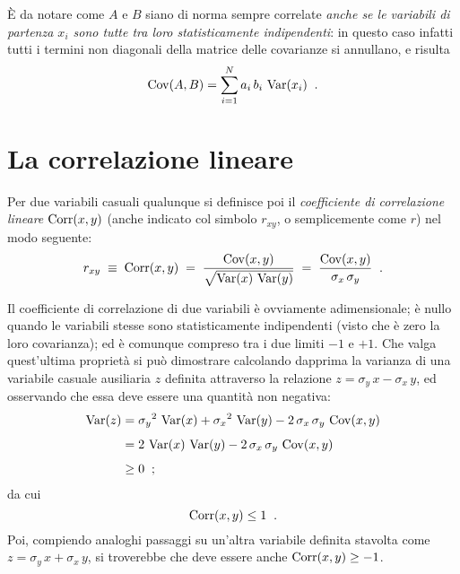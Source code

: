\`E da notare come $A$ e $B$ siano di norma sempre correlate
\emph{anche se le variabili di partenza $x_i$ sono tutte tra
  loro statisticamente indipendenti}: in questo caso infatti
tutti i termini non diagonali della matrice delle covarianze
si annullano, e risulta
\begin{equation} \label{eq:c.covcol}
  \operatorname{Cov}( A,B ) = \sum_{i=1}^N a_i \, b_i \, \operatorname{Var}( x_i ) \;\; .
\end{equation}%

\section{La correlazione lineare}%
Per due variabili casuali qualunque si definisce poi il
\emph{coefficiente di correlazione lineare} $ \operatorname{Corr}(x,y) $
(anche indicato col simbolo $ r_{xy} $, o semplicemente come
$r$) nel modo seguente:
\begin{equation*}
  r_{xy} \; \equiv \;
    \operatorname{Corr} (x, y) \; = \;
    \frac{\operatorname{Cov} (x, y)} {\sqrt{ \operatorname{Var}(x) \, \operatorname{Var}(y) }}
    \; = \; \frac{\operatorname{Cov} (x, y)} {\sigma_x \, \sigma_y} \;\; .
\end{equation*}

Il coefficiente di correlazione di due variabili \`e
ovviamente adimensionale; \`e nullo quando le variabili
stesse sono statisticamente indipendenti%
(visto che \`e zero la loro covarianza); ed \`e comunque
compreso tra i due limiti $-1$ e $+1$.  Che valga
quest'ultima propriet\`a si pu\`o dimostrare calcolando
dapprima la varianza di una variabile casuale ausiliaria $z$
definita attraverso la relazione $z = \sigma_y \, x -
\sigma_x \, y$, ed osservando che essa deve essere una
quantit\`a non negativa:
\begin{align*}
  \operatorname{Var} (z) &= {\sigma_y}^2 \, \operatorname{Var}(x) + {\sigma_x}^2
    \, \operatorname{Var}(y) - 2 \, \sigma_x \, \sigma_y \,
    \operatorname{Cov} (x, y) \\[1ex]
  &= 2 \, \operatorname{Var}(x) \, \operatorname{Var}(y) -
    2 \, \sigma_x \, \sigma_y \, \operatorname{Cov} (x, y)
    \\[1ex]
  &\ge 0 \;\; ;
\end{align*}
da cui
\begin{equation*}
  \operatorname{Corr} (x, y) \le 1 \;\; .
\end{equation*}
Poi, compiendo analoghi passaggi su un'altra variabile
definita stavolta come $z = \sigma_y \, x + \sigma_x \, y$,
si troverebbe che deve essere anche $ \operatorname{Corr} (x, y) \ge -1 $.


